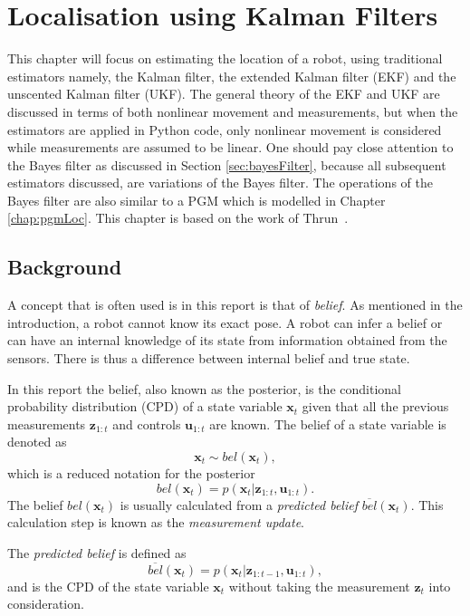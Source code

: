 \documentclass[12pt,oneside,openany,a4paper, %
afrikaans,english,
]{memoir}
\numberwithin{equation}{chapter}
\begin{document}
\chapter{Localisation using Kalman Filters}\label{chap:kalmanFilter}
This chapter will focus on estimating the location of a robot, using traditional estimators namely, the Kalman filter, the extended Kalman filter (EKF) and the unscented Kalman filter (UKF). The general theory of the EKF and UKF are discussed in terms of both nonlinear movement and measurements, but when the estimators are applied in Python code, only nonlinear movement is considered while measurements are assumed to be linear. One should pay close attention to the Bayes filter as discussed in Section \ref{sec:bayesFilter}, because all subsequent estimators discussed, are variations of the Bayes filter. The operations of the Bayes filter are also similar to a PGM which is modelled in Chapter \ref{chap:pgmLoc}. This chapter is based on the work of Thrun~\citep{thrun}. 

\section{Background}
A concept that is often used is in this report is that of \textit{belief}. As mentioned in the introduction, a robot cannot know its exact pose. A robot can infer a belief or can have an internal knowledge of its state from information obtained from the sensors. There is thus a difference between internal belief and true state.

In this report the belief, also known as the posterior, is the conditional probability distribution (CPD) of a state variable $\bm{x}_t$ given that all the previous measurements $\bm{z}_{1:t}$ and controls $\bm{u}_{1:t}$ are known. The belief of a state variable is denoted as
\begin{equation}
\bm{x}_t \sim bel(\bm{x}_t),
\end{equation}
which is a reduced notation for the posterior
\begin{equation}
bel(\bm{x}_t) = p(\bm{x}_t| \bm{z}_{1:t}, \bm{u}_{1:t}).
\end{equation}
The belief $bel(\bm{x}_t)$ is usually calculated from a \textit{predicted belief} $\overline{bel}(\bm{x}_t)$. This calculation step is known as the \textit{measurement update}.

The \textit{predicted belief} is defined as
\begin{equation}
\overline{bel}(\bm{x}_t) = p(\bm{x}_t|\bm{z}_{1:t-1}, \bm{u}_{1:t}),
\end{equation} 
and is the CPD of the state variable $\bm{x}_t$ without taking the measurement $\bm{z}_t$ into consideration.
\end{document}
